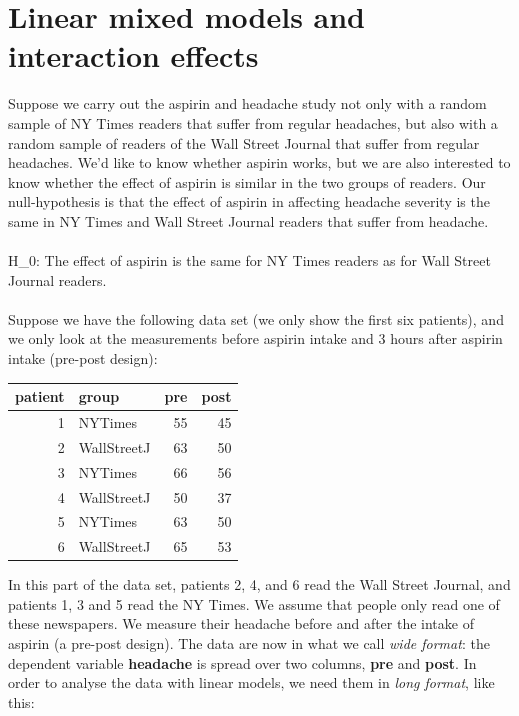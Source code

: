 \documentclass[]{report}\usepackage[]{graphicx}\usepackage[]{color}
\newenvironment{knitrout}{}{} %
\begin{document}
\section{Linear mixed models and interaction effects}


Suppose we carry out the aspirin and headache study not only with a random sample of NY Times readers that suffer from regular headaches, but also with a random sample of readers of the Wall Street Journal that suffer from regular headaches. We'd like to know whether aspirin works, but we are also interested to know whether the effect of aspirin is similar in the two groups of readers. Our null-hypothesis is that the effect of aspirin in affecting headache severity is the same in NY Times and Wall Street Journal readers that suffer from headache.\\
\\
H\_0: The effect of aspirin is the same for NY Times readers as for Wall Street Journal readers.
\\
\\
Suppose we have the following data set (we only show the first six patients), and we only look at the measurements before aspirin intake and 3 hours after aspirin intake (pre-post design):

\begin{knitrout}
\color{fgcolor}
\begin{tabular}{r|l|r|r}
\hline
patient & group & pre & post\\
\hline
1 & NYTimes & 55 & 45\\
\hline
2 & WallStreetJ & 63 & 50\\
\hline
3 & NYTimes & 66 & 56\\
\hline
4 & WallStreetJ & 50 & 37\\
\hline
5 & NYTimes & 63 & 50\\
\hline
6 & WallStreetJ & 65 & 53\\
\hline
\end{tabular}


\end{knitrout}



In this part of the data set, patients 2, 4, and 6 read the Wall Street Journal, and patients 1, 3 and 5 read the NY Times. We assume that people only read one of these newspapers. We measure their headache before and after the intake of aspirin (a pre-post design). The data are now in what we call \textit{wide format}: the dependent variable \textbf{headache} is spread over two columns, \textbf{pre} and \textbf{post}. In order to analyse the data with linear models, we need them in \textit{long format}, like this:
\end{document}
